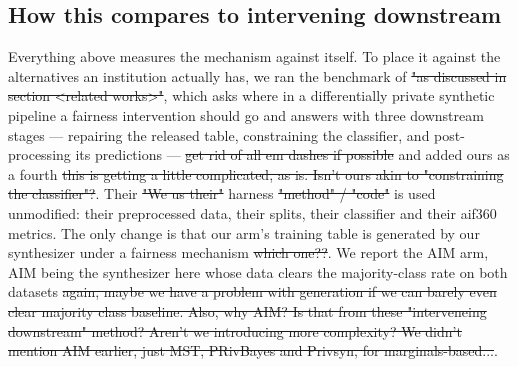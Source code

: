 \documentclass{article}
\begin{document}
{{\subsection{How this compares to intervening downstream}



Everything above measures the mechanism against itself. To place it against the
alternatives an institution actually has, we ran the benchmark of
\citet{angelozzi2026where} \st{"as discussed in section <related works>"}, which asks where in a differentially private synthetic
pipeline a fairness intervention should go and answers with three downstream
stages --- repairing the released table, constraining the classifier, and
post-processing its predictions --- \st{get rid of all em dashes if possible} and added ours as a fourth \st{this is getting a little complicated, as is. Isn't ours akin to "constraining the classifier"?}. Their \st{"We us their"} harness \st{"method" / "code"} is
used unmodified: their preprocessed data, their splits, their classifier and their
aif360 metrics. The only change is that our arm's training table is generated by
our synthesizer under a fairness mechanism \st{which one??}. We report the AIM arm, AIM being the
synthesizer here whose data clears the majority-class rate on both datasets \st{again, maybe we have a problem with generation if we can barely even clear majority class baseline. Also, why AIM? Is that from these "interveneing downstream" method? Aren't we introducing more complexity? We didn't mention AIM earlier, just MST, PRivBayes and Privsyn, for marginals-based...}.

}}
\end{document}
